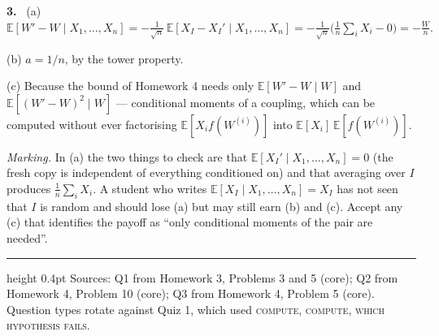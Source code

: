 \documentclass[11pt]{article}
\newcommand{\E}{\mathbb{E}}
\begin{document}
\vspace{0.9em}

\textbf{3.} \ (a) $\displaystyle \E[W'-W\mid X_1,\dots,X_n]=-\tfrac{1}{\sqrt n}\,\E[X_I-X_I'\mid X_1,\dots,X_n]=-\tfrac{1}{\sqrt n}\Big(\tfrac1n\sum_iX_i-0\Big)=-\frac{W}{n}.$

(b) $a=1/n$, by the tower property.

(c) Because the bound of Homework 4 needs only $\E[W'-W\mid W]$ and $\E[(W'-W)^2\mid W]$ --- conditional moments of a coupling, which can be computed without ever factorising $\E[X_if(W^{(i)})]$ into $\E[X_i]\,\E[f(W^{(i)})]$.

{\color{grey}\emph{Marking.} In (a) the two things to check are that $\E[X_I'\mid X_1,\dots,X_n]=0$ (the fresh copy is independent of everything conditioned on) and that averaging over $I$ produces $\frac1n\sum_iX_i$. A student who writes $\E[X_I\mid X_1,\dots,X_n]=X_I$ has not seen that $I$ is random and should lose (a) but may still earn (b) and (c). Accept any (c) that identifies the payoff as ``only conditional moments of the pair are needed''.}

\vspace{1.1em}
\hrule height 0.4pt
\vspace{0.3em}
{\footnotesize\color{grey} Sources: Q1 from Homework 3, Problems 3 and 5 (core); Q2 from Homework 4, Problem 10 (core); Q3 from Homework 4, Problem 5 (core). Question types rotate against Quiz 1, which used \textsc{compute}, \textsc{compute}, \textsc{which hypothesis fails}.}
\end{document}
